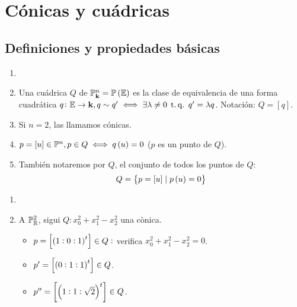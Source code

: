\chapter{Cónicas y cuádricas}

\section{Definiciones y propiedades básicas}

\begin{defi}
	\begin{enumerate}
		\item[]
		\item Una cuádrica $Q$ de $\mathbb{P}^n_{\mathbf{k}} = \mathbb{P}\left( \mathbb{E}\right)$ es la clase de equivalencia de una forma cuadrática  $q \colon \mathbb{E} \to \mathbf{k}, q\sim q' \iff \exists \lambda\neq0\operatorname{\;t.q.\;} q' = \lambda q$. Notación: $Q = [q]$.
		\item Si $n = 2$, las llamamos cónicas.
		\item $p = [u] \in \mathbb{P}^n, p\in Q \iff q\left( u\right)=0$ ($p$ es un punto de $Q$).
		\item También notaremos por $Q$, el conjunto de todos los puntos de $Q$:
			\[ Q = \left\{ p=[u]\;|\;p\left( u\right)=0\right\} \]
	\end{enumerate}
\end{defi}
\begin{example}
	\begin{enumerate}
		\item[]
		\item A $\mathbb{P}^2_{\mathbb{R}}$, sigui $Q \colon x_0^2 + x_1^2 - x_2^2$ una cònica.
		\begin{itemize}
			\item $p = \left[\left(1:0:1\right)^t\right] \in Q:$ verifica $x_0^2 + x_1^2 -x_2^2=0$.
			\item $p' = \left[\left(0:1:1\right)^t\right] \in Q$.
			\item $p'' = \left[\left(1:1:\sqrt{2}\right)^t\right] \in Q$.
		\end{itemize}
	\end{enumerate}
\end{example}

